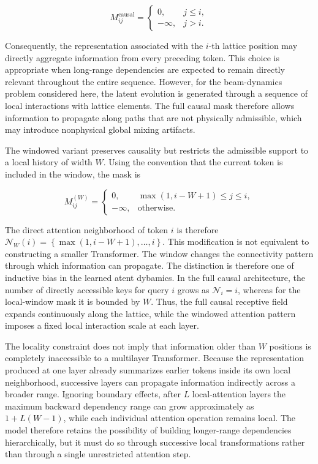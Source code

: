 \[
    M_{ij}^{\mathrm{causal}}
    =
    \begin{cases}
        0,
        & j\leq i,\\
        -\infty,
        & j>i.
    \end{cases}
\]

Consequently, the representation associated with the $i$-th lattice
position may directly aggregate information from every preceding token. This choice is appropriate when long-range dependencies are expected to remain directly relevant throughout the entire sequence. However, for the beam-dynamics problem considered here, the latent evolution is generated through a sequence of local interactions with lattice elements. The full causal mask therefore allows information to propagate along paths that are not physically admissible, which may introduce nonphysical global mixing artifacts.


The windowed variant preserves causality but restricts the admissible
support to a local history of width $W$. Using the convention that the
current token is included in the window, the mask is

\[
    M_{ij}^{(W)}
    =
    \begin{cases}
        0,
        &
        \max(1,i-W+1)
        \leq
        j
        \leq
        i,\\
        -\infty,
        &
        \text{otherwise}.
    \end{cases}
\]

The direct attention neighborhood of token $i$ is therefore $\mathcal{N}_{W}(i)=\left\{ \max(1,i-W+1), \ldots, i \right\}$. This modification is not equivalent to constructing a smaller Transformer. The window changes the connectivity pattern through which information can propagate. The distinction is therefore one of inductive bias in the learned atent dybamics. In the full causal architecture, the number of directly accessible keys for query $i$ grows as $ \mathcal{N}_i = i$, whereas for the local-window mask it is bounded by $W$. Thus, the full causal receptive field expands continuously along the lattice, while the windowed attention pattern imposes a fixed local interaction scale at each layer. 

The locality constraint does not imply that information older than $W$ positions is completely inaccessible to a multilayer Transformer. Because the representation produced at one layer already summarizes earlier tokens inside its own local neighborhood, successive layers can propagate information indirectly across a broader range. Ignoring boundary effects, after $L$ local-attention layers the maximum backward dependency range can grow approximately as $1 + L(W-1)$, while each individual attention operation remains local. The model therefore retains the possibility of building longer-range dependencies hierarchically, but it must do so through successive local transformations rather than through a single unrestricted attention step.

